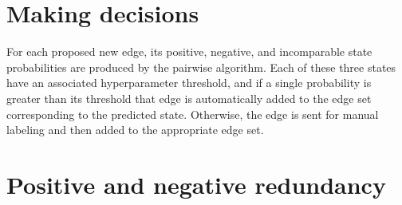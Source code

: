 \section{Making decisions}\label{sec:decision}


For each proposed new edge, its positive, negative, and incomparable state
  probabilities are produced by the pairwise algorithm.
Each of these three states have an associated hyperparameter threshold, and if
  a single probability is greater than its threshold that edge is automatically
  added to the edge set corresponding to the predicted state.
Otherwise, the edge is sent for manual labeling and then added to the
  appropriate edge set.

\section{Positive and negative redundancy}\label{sec:redun}

